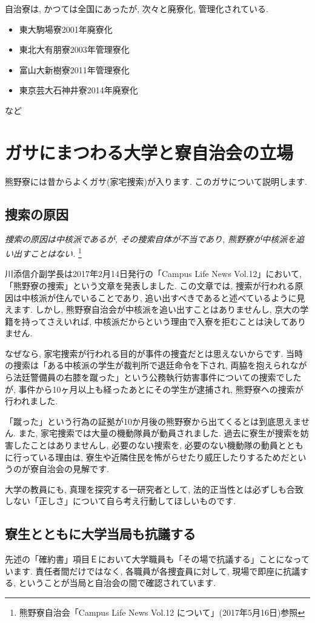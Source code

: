 \documentclass[10pt,b5jsbook,dvips,dvipdfmx,openany]{jsbook}
\theoremstyle{definition}
\begin{document}
		自治寮は, かつては全国にあったが, 次々と廃寮化, 管理化されている.
		\begin{itemize}
		\item 東大駒場寮2001年廃寮化
		\item 東北大有朋寮2003年管理寮化
		\item 富山大新樹寮2011年管理寮化
		\item 東京芸大石神井寮2014年廃寮化
		\end{itemize}
		など




	\section{ガサにまつわる大学と寮自治会の立場}
	熊野寮には昔からよくガサ(家宅捜索)が入ります. このガサについて説明します.

		\subsection{捜索の原因}
		\emph{捜索の原因は中核派であるが, その捜索自体が不当であり, 熊野寮が中核派を追い出すことはない. }\footnote{熊野寮自治会「Campus Life News Vol.12 について」(2017年5月16日)参照}

 		川添信介副学長は2017年2月14日発行の「Campus Life News Vol.12」において, 「熊野寮の捜索」という文章を発表しました. この文章では, 捜索が行われる原因は中核派が住んでいることであり, 追い出すべきであると述べているように見えます. しかし, 熊野寮自治会が中核派を追い出すことはありませんし, 京大の学籍を持ってさえいれば, 中核派だからという理由で入寮を拒むことは決してありません.

		なぜなら, 家宅捜索が行われる目的が事件の捜査だとは思えないからです. 当時の捜索は「ある中核派の学生が裁判所で退廷命令を下され, 両脇を抱えられながら法廷警備員の右膝を蹴った」という公務執行妨害事件についての捜索でしたが, 事件から10ヶ月以上も経ったあとにその学生が逮捕され, 熊野寮への捜索が行われました.

		「蹴った」という行為の証拠が10か月後の熊野寮から出てくるとは到底思えません. また, 家宅捜索では大量の機動隊員が動員されました. 過去に寮生が捜索を妨害したことはありませんし, 必要のない捜索を, 必要のない機動隊の動員とともに行っている理由は, 寮生や近隣住民を怖がらせたり威圧したりするためだというのが寮自治会の見解です.

 		大学の教員にも, 真理を探究する一研究者として, 法的正当性とは必ずしも合致しない「正しさ」について自ら考え行動してほしいものです.

		\subsection{寮生とともに大学当局も抗議する}
		先述の「確約書」項目Ｅにおいて大学職員も「その場で抗議する」ことになっています. 責任者間だけではなく, 各職員が各捜査員に対して, 現場で即座に抗議する, ということが当局と自治会の間で確認されています.
\end{document}

